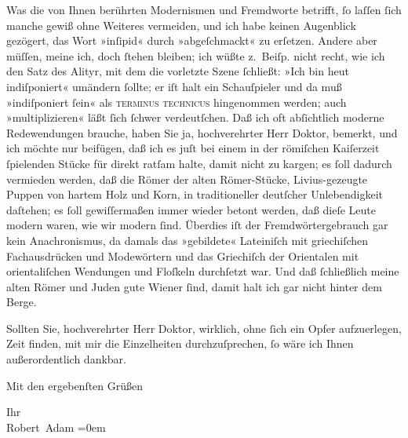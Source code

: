\pstart
           Was die von Ihnen berührten Modernismen und Fremdworte betrifft,{ }ſo laſſen{ }ſich
               manche gewiß ohne Weiteres vermeiden, und ich habe keinen Augenblick gezögert, das
               Wort »inſipid« durch »abgeſchmackt« zu erſetzen. Andere aber müſſen, meine ich, doch{ }ſtehen bleiben; ich wüßte z. Beiſp. nicht recht, wie ich den Satz des Alityr, mit dem
               die vorletzte Szene{ }ſchließt: »Ich bin heut indiſponiert« umändern{ }ſollte; er iſt
               halt ein Schauſpieler und da muß »indiſponiert{ }ſein« als \textsc{terminus technicus} hingenommen werden; auch »multiplizieren« läßt{ }ſich{ }ſchwer verdeutſchen. Daß ich oft abſichtlich moderne Redewendungen brauche, haben Sie
               ja, hochverehrter Herr Doktor, be{\pb}merkt,
               und ich möchte nur beifügen, daß ich es juſt bei einem in der römiſchen Kaiſerzeit{ }ſpielenden Stücke für direkt ratſam halte,
               damit nicht zu kargen; es{ }ſoll dadurch vermieden werden, daß die Römer der alten Römer-Stücke, Livius-gezeugte Puppen von
               hartem Holz und Korn, in traditioneller deutſcher Unlebendigkeit daſtehen; es{ }ſoll
               gewiſſermaßen immer wieder betont werden, daß dieſe Leute modern waren, wie wir
               modern{ }ſind. Überdies iſt der Fremdwörtergebrauch gar kein Anachronismus, da damals
               das »gebildete« Lateiniſch mit griechiſchen
               Fachausdrücken und Modewörtern und das Griechiſch der Orientalen mit orientaliſchen Wendungen und Floſkeln
               durchſetzt war. Und daß{ }ſchließlich meine alten Römer und Juden gute Wiener{ }ſind, damit
               halt ich gar nicht hinter dem Berge.\pend
           
\pstart
           Sollten Sie, hochverehrter Herr Doktor, wirklich, ohne{ }ſich ein Opfer aufzuerlegen,
               Zeit finden, mit mir die Einzelheiten durchzuſprechen,{ }ſo wäre ich Ihnen
               außerordentlich dankbar.\pend
           
\pstart
           Mit den ergebenſten Grüßen\pend
           
\pstart
           Ihr{\\[\baselineskip]}\spacefill\mbox{Robert Adam}\pend
           \leftskip=0em{}\endnumbering{}  \newcommand{\dateiname}{L02279}\newcommand{\titel}{Robert Adam an Arthur Schnitzler, 5. 11. 1917}\newcommand{\editorInnen}{Martin Anton Müller und Gerd-Hermann Susen}
